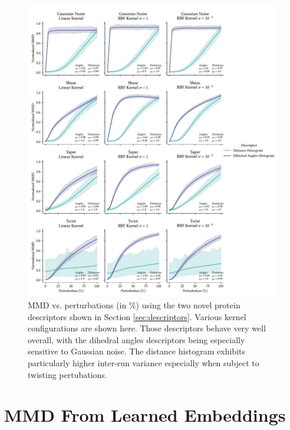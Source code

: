 \begin{figure}
  \includegraphics[width=\textwidth]{./figures/results/res_4.pdf}
  \caption[MMD vs. perturbations using the two novel protein descriptors.]{MMD
vs. perturbations (in \%) using the two novel protein descriptors shown in Section
\ref{sec:descriptors}. Various kernel configurations are shown here. Those
descriptors behave very well overall, with the dihedral angles descriptors being
especially sensitive to Gaussian noise. The distance histogram exhibits
particularly higher inter-run variance especially when subject to twisting
pertubations.}
  \label{fig:protein_specific_descriptors}
\end{figure}

\section{MMD From Learned Embeddings}

